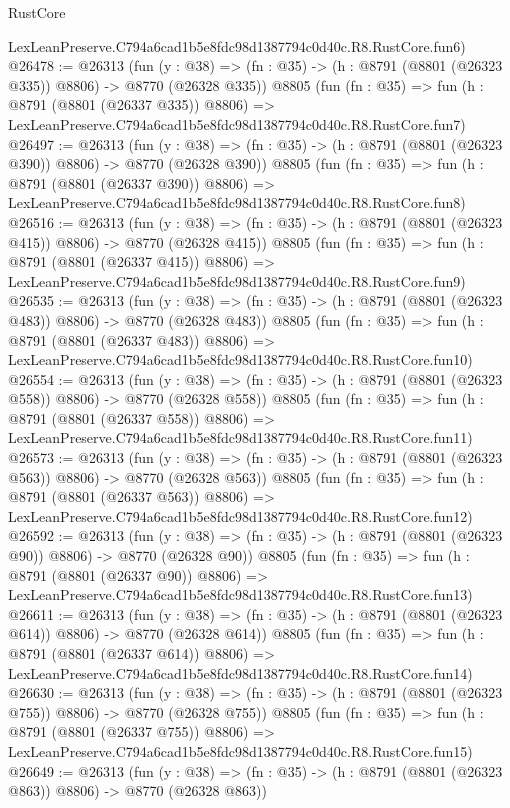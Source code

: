 \begin{lexlean}{RustCore}
\begin{coremodule}
    LexLeanPreserve.C794a6cad1b5e8fdc98d1387794c0d40c.R8.RustCore.fun6)
@26478 := @26313
    (fun (y : @38) => (fn : @35) -> (h : @8791 (@8801 (@26323 @335)) @8806) -> @8770 (@26328 @335))
    @8805
    (fun (fn : @35) =>
    fun (h : @8791 (@8801 (@26337 @335)) @8806) =>
    LexLeanPreserve.C794a6cad1b5e8fdc98d1387794c0d40c.R8.RustCore.fun7)
@26497 := @26313
    (fun (y : @38) => (fn : @35) -> (h : @8791 (@8801 (@26323 @390)) @8806) -> @8770 (@26328 @390))
    @8805
    (fun (fn : @35) =>
    fun (h : @8791 (@8801 (@26337 @390)) @8806) =>
    LexLeanPreserve.C794a6cad1b5e8fdc98d1387794c0d40c.R8.RustCore.fun8)
@26516 := @26313
    (fun (y : @38) => (fn : @35) -> (h : @8791 (@8801 (@26323 @415)) @8806) -> @8770 (@26328 @415))
    @8805
    (fun (fn : @35) =>
    fun (h : @8791 (@8801 (@26337 @415)) @8806) =>
    LexLeanPreserve.C794a6cad1b5e8fdc98d1387794c0d40c.R8.RustCore.fun9)
@26535 := @26313
    (fun (y : @38) => (fn : @35) -> (h : @8791 (@8801 (@26323 @483)) @8806) -> @8770 (@26328 @483))
    @8805
    (fun (fn : @35) =>
    fun (h : @8791 (@8801 (@26337 @483)) @8806) =>
    LexLeanPreserve.C794a6cad1b5e8fdc98d1387794c0d40c.R8.RustCore.fun10)
@26554 := @26313
    (fun (y : @38) => (fn : @35) -> (h : @8791 (@8801 (@26323 @558)) @8806) -> @8770 (@26328 @558))
    @8805
    (fun (fn : @35) =>
    fun (h : @8791 (@8801 (@26337 @558)) @8806) =>
    LexLeanPreserve.C794a6cad1b5e8fdc98d1387794c0d40c.R8.RustCore.fun11)
@26573 := @26313
    (fun (y : @38) => (fn : @35) -> (h : @8791 (@8801 (@26323 @563)) @8806) -> @8770 (@26328 @563))
    @8805
    (fun (fn : @35) =>
    fun (h : @8791 (@8801 (@26337 @563)) @8806) =>
    LexLeanPreserve.C794a6cad1b5e8fdc98d1387794c0d40c.R8.RustCore.fun12)
@26592 := @26313
    (fun (y : @38) => (fn : @35) -> (h : @8791 (@8801 (@26323 @90)) @8806) -> @8770 (@26328 @90))
    @8805
    (fun (fn : @35) =>
    fun (h : @8791 (@8801 (@26337 @90)) @8806) =>
    LexLeanPreserve.C794a6cad1b5e8fdc98d1387794c0d40c.R8.RustCore.fun13)
@26611 := @26313
    (fun (y : @38) => (fn : @35) -> (h : @8791 (@8801 (@26323 @614)) @8806) -> @8770 (@26328 @614))
    @8805
    (fun (fn : @35) =>
    fun (h : @8791 (@8801 (@26337 @614)) @8806) =>
    LexLeanPreserve.C794a6cad1b5e8fdc98d1387794c0d40c.R8.RustCore.fun14)
@26630 := @26313
    (fun (y : @38) => (fn : @35) -> (h : @8791 (@8801 (@26323 @755)) @8806) -> @8770 (@26328 @755))
    @8805
    (fun (fn : @35) =>
    fun (h : @8791 (@8801 (@26337 @755)) @8806) =>
    LexLeanPreserve.C794a6cad1b5e8fdc98d1387794c0d40c.R8.RustCore.fun15)
@26649 := @26313
    (fun (y : @38) => (fn : @35) -> (h : @8791 (@8801 (@26323 @863)) @8806) -> @8770 (@26328 @863))

\end{coremodule}
\end{lexlean}
